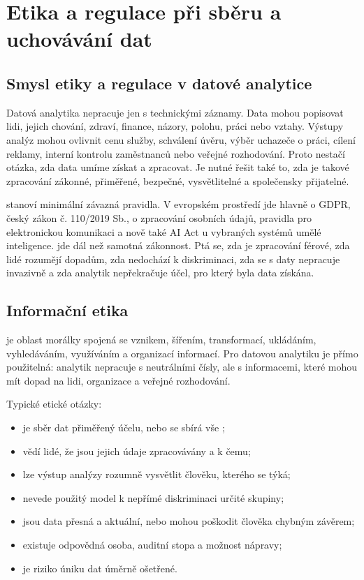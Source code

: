 \section{Etika a regulace při sběru a uchovávání dat}

\subsection{Smysl etiky a regulace v datové analytice}
Datová analytika nepracuje jen s technickými záznamy. Data mohou popisovat lidi, jejich chování,
zdraví, finance, názory, polohu, práci nebo vztahy. Výstupy analýz mohou ovlivnit cenu služby,
schválení úvěru, výběr uchazeče o práci, cílení reklamy, interní kontrolu zaměstnanců nebo veřejné
rozhodování. Proto nestačí otázka, zda data umíme získat a zpracovat. Je nutné řešit také to, zda
je takové zpracování zákonné, přiměřené, bezpečné, vysvětlitelné a společensky přijatelné.

 stanoví minimální závazná pravidla. V evropském prostředí jde hlavně o GDPR, český
zákon č. 110/2019 Sb., o zpracování osobních údajů, pravidla pro elektronickou komunikaci a nově také
AI Act u vybraných systémů umělé inteligence.  jde dál než samotná zákonnost. Ptá se,
zda je zpracování férové, zda lidé rozumějí dopadům, zda nedochází k diskriminaci, zda se s daty
nepracuje invazivně a zda analytik nepřekračuje účel, pro který byla data získána.

\subsection{Informační etika}
 je oblast morálky spojená se vznikem, šířením, transformací, ukládáním,
vyhledáváním, využíváním a organizací informací. Pro datovou analytiku je přímo použitelná: analytik
nepracuje s neutrálními čísly, ale s informacemi, které mohou mít dopad na lidi, organizace a veřejné
rozhodování.

Typické etické otázky:
\begin{itemize}
  \item je sběr dat přiměřený účelu, nebo se sbírá vše ;
  \item vědí lidé, že jsou jejich údaje zpracovávány a k čemu;
  \item lze výstup analýzy rozumně vysvětlit člověku, kterého se týká;
  \item nevede použitý model k nepřímé diskriminaci určité skupiny;
  \item jsou data přesná a aktuální, nebo mohou poškodit člověka chybným závěrem;
  \item existuje odpovědná osoba, auditní stopa a možnost nápravy;
  \item je riziko úniku dat úměrně ošetřené.
\end{itemize}

